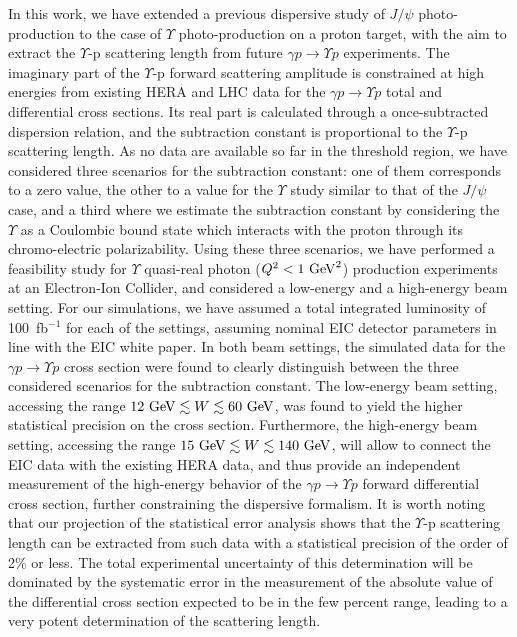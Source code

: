 \documentclass[prd,amsmath,twocolumn,floatfix,amssymb, preprintnumbers, linenumbers,nofootinbib, superscriptaddress]{revtex4}
\begin{document}
In this work, we have extended a previous dispersive study of $J/\psi$ photo-production to the case of $\Upsilon$ photo-production on a proton target, with the aim to extract the $\Upsilon$-p scattering length from future $\gamma p \to \Upsilon p$ experiments. The imaginary part of the $\Upsilon$-p forward scattering amplitude is constrained at high energies from existing HERA and LHC data for the $\gamma p \to \Upsilon p$ total and differential cross sections. 
Its real part is calculated through a once-subtracted dispersion relation, and the subtraction constant is proportional to the $\Upsilon$-p scattering length. 
As no data are available so far in the threshold region, we have  considered three scenarios for the subtraction constant: one of them corresponds to a zero value, the other to a value for the $\Upsilon$ study similar to that of the $J/\psi$ case, and a third where we estimate the subtraction constant by considering the $\Upsilon$ as a Coulombic bound state which interacts with the proton through its chromo-electric polarizability. 
Using these three scenarios, we have performed a feasibility study for $\Upsilon$ quasi-real photon ($Q^2 < 1~\rm{GeV}^2$) production experiments at an Electron-Ion Collider, and considered a low-energy and a high-energy beam setting. 
For our simulations, we have assumed a total integrated luminosity of 100~fb$^{-1}$ for each of the settings, assuming nominal EIC detector parameters in line with the EIC white paper.   
In both beam settings, the simulated data for the $\gamma p \to \Upsilon p$ cross section were found to clearly distinguish between the three considered scenarios for the subtraction constant.
The low-energy beam setting, accessing the range $12~{\rm{GeV}}\lesssim W \lesssim 60~{\rm{GeV}}$, was found to yield the higher statistical precision on the cross section. Furthermore, the high-energy beam setting, accessing the range $15~{\rm{GeV}}\lesssim W \lesssim 140~{\rm{GeV}}$, will allow to connect the EIC data with the existing HERA data, and thus provide an independent measurement of the high-energy behavior of the $\gamma p \to \Upsilon p$ forward differential cross section, further constraining the dispersive formalism. It is worth noting that our projection of the statistical error analysis shows that the $\Upsilon$-p scattering length can be extracted from such data with a statistical precision of the order of 2\% or less. The total experimental uncertainty of this determination will be dominated by the systematic error in the measurement of the absolute value of the differential cross section expected to be in the few percent range,  leading to a very potent determination of the scattering length.
\end{document}
